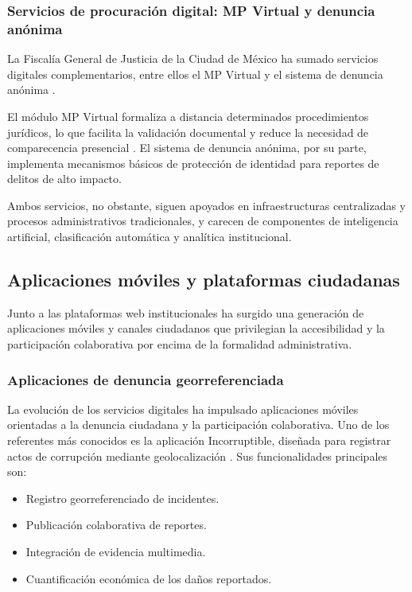 	\subsubsection{Servicios de procuración digital: MP Virtual y denuncia anónima}
	La Fiscalía General de Justicia de la Ciudad de México ha sumado servicios digitales
	complementarios, entre ellos el MP Virtual y el sistema de denuncia anónima
	\cite{fgjcdmx_servicios_linea}.
	
	El módulo MP Virtual formaliza a distancia determinados procedimientos jurídicos, lo que facilita la
	validación documental y reduce la necesidad de comparecencia presencial \cite{fgjcdmx_mp_virtual}.
	El sistema de denuncia anónima, por su parte, implementa mecanismos básicos de protección de
	identidad para reportes de delitos de alto impacto.
	
	Ambos servicios, no obstante, siguen apoyados en infraestructuras centralizadas y procesos
	administrativos tradicionales, y carecen de componentes de inteligencia artificial, clasificación
	automática y analítica institucional.
	
	\subsection{Aplicaciones móviles y plataformas ciudadanas}
	Junto a las plataformas web institucionales ha surgido una generación de aplicaciones móviles y
	canales ciudadanos que privilegian la accesibilidad y la participación colaborativa por encima de la
	formalidad administrativa.
	
	\subsubsection{Aplicaciones de denuncia georreferenciada}
	La evolución de los servicios digitales ha impulsado aplicaciones móviles orientadas a la denuncia
	ciudadana y la participación colaborativa. Uno de los referentes más conocidos es la aplicación
	Incorruptible, diseñada para registrar actos de corrupción mediante geolocalización
	\cite{nacion321_apps_corrupcion}. Sus funcionalidades principales son:
	
	\begin{itemize}
		\item Registro georreferenciado de incidentes.
		\item Publicación colaborativa de reportes.
		\item Integración de evidencia multimedia.
		\item Cuantificación económica de los daños reportados.
	\end{itemize}
	
